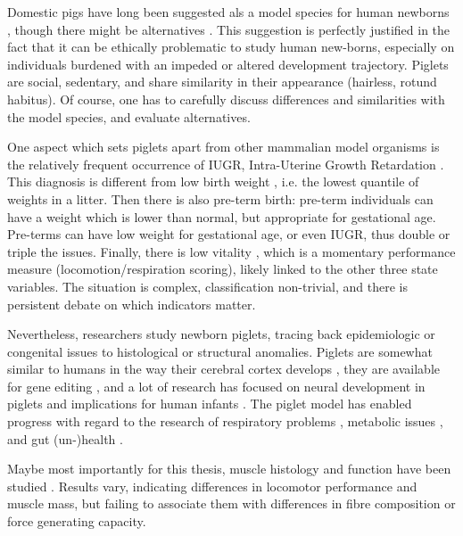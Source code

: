 Domestic pigs have long been suggested als a model species for human newborns \citep{Book1974,Cooper1975}, though there might be alternatives \citep{Mellor1986}.
This suggestion is perfectly justified in the fact that it can be ethically problematic to study human new-borns, especially on individuals burdened with an impeded or altered development trajectory.
Piglets are social, sedentary, and share similarity in their appearance (hairless, rotund habitus).
Of course, one has to carefully discuss differences and similarities with the model species, and evaluate alternatives.

One aspect which sets piglets apart from other mammalian model organisms is the relatively frequent occurrence of IUGR, Intra-Uterine Growth Retardation \citep{Widdowson1971,Wootton1983,Wu2006,VanGinneken2022}.
This diagnosis is different from low birth weight \citep{Wootton1983}, i.e. the lowest quantile of weights in a litter.
Then there is also pre-term birth: pre-term individuals can have a weight which is lower than normal, but appropriate for gestational age.
Pre-terms can have low weight for gestational age, or even IUGR, thus double or triple the issues.
Finally, there is low vitality \citep{VandenHole2018}, which is a momentary performance measure (locomotion/respiration scoring), likely linked to the other three state variables.
The situation is complex, classification non-trivial, and there is persistent debate on which indicators matter.


Nevertheless, researchers study newborn piglets, tracing back epidemiologic or congenital issues to histological or structural anomalies.
Piglets are somewhat similar to humans in the way their cerebral cortex develops \citep{Lind2007}, they are available for gene editing \citep{Lind2007}, and a lot of research has focused on neural development in piglets and implications for human infants \citep{Conrad2012,Radlowski2014,Leyshon2016,Mudd2017,Dickerson1971,Fanous2020}.
The piglet model has enabled progress with regard to the research of respiratory problems \citep{Williams1974,Spengler2019}, metabolic issues \citep{Mellor1986,MotaRojas2011,VandenHole2019}, and gut (un-)health \citep{Che2010,Cilieborg2011,Sangild2006,DInca2011,VandenHole2021}.

Maybe most importantly for this thesis, muscle histology and function have been studied \citep{VandenHole2018b,Alvarenga2013,Andersen2016,Aerts2023}.
Results vary, indicating differences in locomotor performance and muscle mass, but failing to associate them with differences in fibre composition or force generating capacity.

